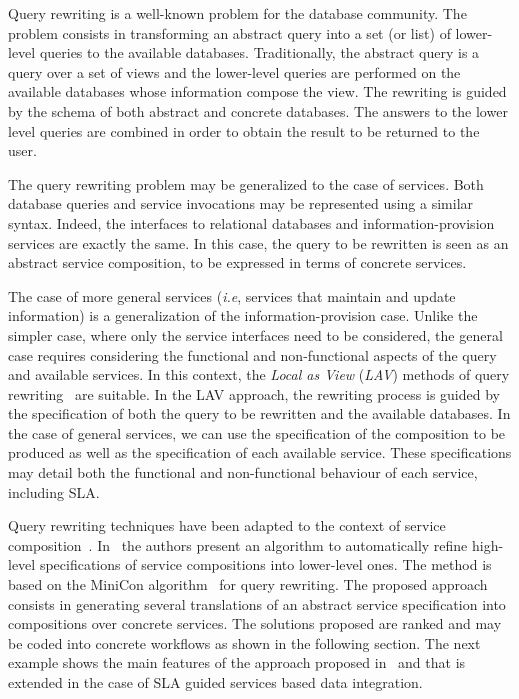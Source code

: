 Query rewriting is a well-known problem for the database community.
The problem consists in transforming an abstract query into a set (or list) of lower-level queries to the available databases.
Traditionally, the abstract query is a query over a set of views and the lower-level queries are performed on the available databases whose information compose the view. 
The rewriting is guided by the schema of both abstract and concrete databases.
The answers to the lower level queries are combined in order to obtain the result to be returned to the user.

The query rewriting problem may be generalized to the case of services.
Both database queries and service invocations may be represented using a similar syntax.
Indeed, the interfaces to relational databases and information-provision
services are exactly the same.
In this case, the query to be rewritten is seen as an abstract service composition, to be expressed in terms of concrete services.

The case of more general services (\textit{i.e}, services that maintain and update information) is a generalization of the information-provision case.
Unlike the simpler case, where only the service interfaces need to be considered, the general case requires considering the functional and non-functional aspects of the query and available services.
In this context, the \textit{Local as View} (\textit{LAV}) methods of query rewriting~\cite{Levy2000} are suitable.
In the LAV approach, the rewriting process is guided by the specification of both the query to be rewritten and the available databases.
In the case of general services, we can use the specification of the composition to be produced as well as the specification of each available service.
These specifications may detail both the functional and non-functional behaviour of each service, including SLA.

Query rewriting techniques have been adapted to the context of service composition~\cite{BBM10,ZLC11,CostaAMR13}. 
In~\cite{CostaAMR13} the authors present an algorithm to automatically refine high-level specifications of service compositions into lower-level ones. 
The method is based on the MiniCon algorithm~\cite{PH01} for query rewriting.
The proposed approach consists in generating several translations of an abstract service specification into compositions
over concrete  services. 
The solutions proposed are ranked and may be coded into concrete workflows as shown in the following section.  The next example shows the main features of the approach proposed in~\cite{CostaAMR13} and that is extended in the case of SLA guided services based data integration. 

